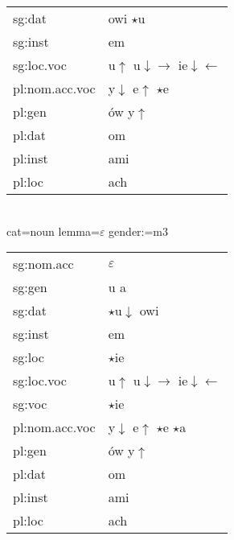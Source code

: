\documentclass{beamer}
\begin{document}
\begin{frame}
\begin{scriptsize}
\begin{multicols}{2}
\begin{tabular}{l|l}
sg:dat & owi $\star$u\\
sg:inst & em\\
sg:loc.voc & u$\uparrow$ u$\downarrow\rightarrow$ ie$\downarrow\leftarrow$\\
pl:nom.acc.voc & y$\downarrow$ e$\uparrow$ $\star$e\\
pl:gen & ów y$\uparrow$\\
pl:dat & om\\
pl:inst & ami\\
pl:loc & ach\\
\end{tabular}\\
cat=noun lemma=$\varepsilon$ gender:=m3\\
\begin{tabular}{l|l}
sg:nom.acc & $\varepsilon$\\
sg:gen & u a\\
sg:dat & $\star$u$\downarrow$ owi\\
sg:inst & em\\
sg:loc & $\star$ie\\
sg:loc.voc & u$\uparrow$ u$\downarrow\rightarrow$ ie$\downarrow\leftarrow$\\
sg:voc & $\star$ie\\
pl:nom.acc.voc & y$\downarrow$ e$\uparrow$ $\star$e $\star$a\\
pl:gen & ów y$\uparrow$\\
pl:dat & om\\
pl:inst & ami\\
pl:loc & ach\\
\end{tabular}\\
\end{multicols}\end{scriptsize}
\end{frame}
\end{document}
